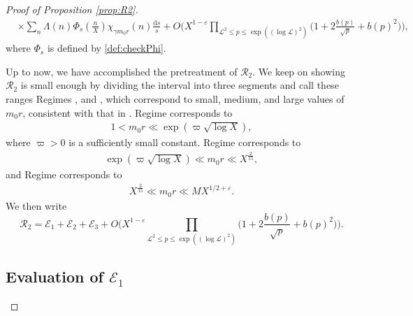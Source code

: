\documentclass[12pt,reqno]{amsart}
\numberwithin{equation}{section}
\theoremstyle{plain}
\theoremstyle{definition}
\theoremstyle{remark}
\newcommand{\dd}{\mathrm{d}}
\begin{document}
\begin{proof}[Proof of Proposition \ref{prop:R2}]
\begin{equation}
\begin{split}
  &\times \sum_{n} \Lambda (n) \Phi_s\left(\frac{n}{X}\right)  \chi_{\gamma m_0 r}(n) \frac{\dd s}{s}
  +O\bigg(X^{1-\varepsilon }\prod_{\mathcal{L}^2\leq p \leq \exp((\log \mathcal{L})^2)}\bigg(1+2\frac{b(p)}
  {\sqrt{p}}+b(p)^2\bigg)\bigg),
  \end{split}
\end{equation}
where $\Phi_s$ is defined by \eqref{def:checkPhi}.

Up to now, we have accomplished the pretreatment of $\mathcal{R}_2$.
We keep on showing $\mathcal{R}_2$ is small enough by dividing the interval into three segments and call these ranges Regimes \uppercase\expandafter{}, \uppercase\expandafter{} and \uppercase\expandafter{}, which correspond to small, medium, and large values of $m_0r$, consistent with that in \cite{BP22}.
Regime \uppercase\expandafter{} corresponds to
\begin{align*}
  1< m_0r \ll \exp(\varpi \sqrt{\log X}),
\end{align*}
where $\varpi>0$ is a sufficiently small constant.
Regime \uppercase\expandafter{} corresponds to
\begin{align*}
  \exp(\varpi \sqrt{\log X}) \ll  m_0r \ll X^{\frac{2}{15}},
\end{align*}
and Regime \uppercase\expandafter{} corresponds to
\begin{align*}
  X^{\frac{2}{15}} \ll  m_0r \ll MX^{1/2+\varepsilon}.
\end{align*}
We then write
\begin{equation}\label{Regime}
  \mathcal{R}_2=\mathcal{E}_1 + \mathcal{E}_2 + \mathcal{E}_3 + O\bigg(X^{1-\varepsilon }\prod_{\mathcal{L}^2\leq p \leq \exp((\log \mathcal{L})^2)}\bigg(1+2\frac{b(p)}
  {\sqrt{p}}+b(p)^2\bigg)\bigg).
\end{equation}


\subsection{Evaluation of $\mathcal{E}_1$}


\end{proof}
\end{document}
